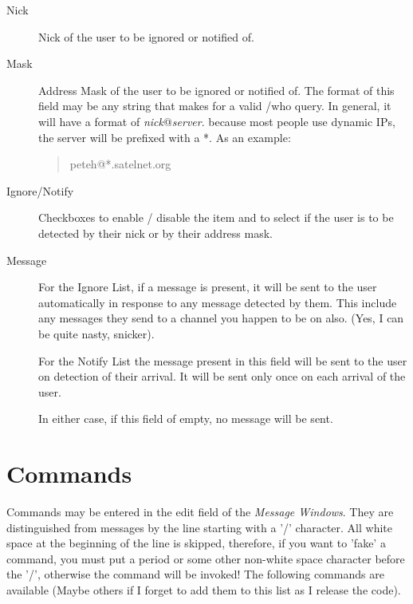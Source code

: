 \documentclass[titlepage]{article}
\begin{document}
\begin{description}
\item[Nick] Nick of the user to be ignored or notified of.
\item[Mask] Address Mask of the user to be ignored or notified of. The
format of this field may be any string that makes for a valid /who query.
In general, it will have a format of \emph{nick}@\emph{server}. because
most people use dynamic IPs, the server will be prefixed with a *. As an
example:

\begin{quote}
peteh@*.satelnet.org
\end{quote}

\item[Ignore/Notify] Checkboxes to enable / disable the item and to select
if the user is to be detected by their nick or by their address mask.
\item[Message] For the Ignore List, if a message is present, it will be
sent to the user automatically in response to any message detected by them.
This include any messages they send to a channel you happen to be on also.
(Yes, I can be quite nasty, snicker).

For the Notify List the message present in this field will be sent to the
user on detection of their arrival. It will be sent only once on each
arrival of the user.

In either case, if this field of empty, no message will be sent.
\end{description}

\section{Commands}
Commands may be entered in the edit field of the \textit{Message
Windows}. They are distinguished from messages by the line starting
with a '/' character. All white space at the beginning of the line is
skipped, therefore, if you want to 'fake' a command, you must put a
period or some other non-white space character before the '/',
otherwise the command will be invoked! The following commands are
available (Maybe others if I forget to add them to this list as I
release the code).
\end{document}
